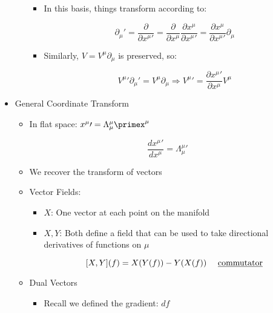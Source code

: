 \begin{itemize}
\begin{itemize}
\begin{itemize}
          \item In this basis, things transform according to:

            $$\partial_{\mu}\prime=\frac{\partial}{\partial x^{\mu}\prime}=\frac{\partial}{\partial x^{\mu}}\frac{\partial x^{\mu}}{\partial x^{\mu}\prime}=\frac{\partial x^{\mu}}{\partial x^{\mu}\prime}\partial_{\mu}$$

          \item Similarly, $V=V^{\mu}\partial_{\mu}$ is preserved, so:

            $$V^{\mu}\prime\partial_{\mu}\prime=V^{\mu}\partial_{\mu}\Rightarrow V^{\mu}\prime=\frac{\partial x^{\mu}\prime}{\partial x^{\mu}}V^{\mu}$$

        \end{itemize}

    \end{itemize}

  \item General Coordinate Transform

    \begin{itemize}

      \item In flat space: $x^{\mu}\prime=\Lambda^{\mu}_{\mu}\primex^{\mu}$

        $$\frac{dx^{\mu}\prime}{dx^{\mu}}=\Lambda^{\mu}_{\mu}\prime$$

      \item We recover the transform of vectors

      \item Vector Fields:

        \begin{itemize}

          \item $X$: One vector at each point on the manifold

          \item $X,Y$: Both define a field that can be used to take directional derivatives of functions on $\mu$

            $$[X,Y](f)=X(Y(f))-Y(X(f))\quad\text{ \underline{commutator}}$$

        \end{itemize}

      \item Dual Vectors

        \begin{itemize}

          \item Recall we defined the gradient: $df$


\end{itemize}
\end{itemize}
\end{itemize}
